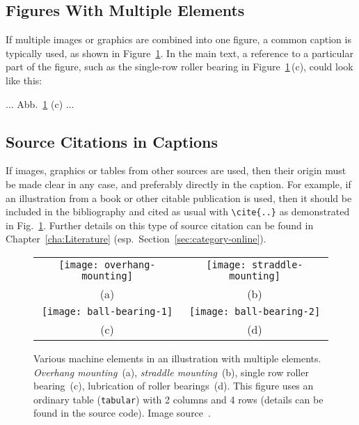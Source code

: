 \subsection{Figures With Multiple Elements}

If multiple images or graphics are combined into one figure, a common caption
is typically used, as shown in Figure~\ref{fig:Bearings}. In the main text, a
reference to a particular part of the figure, such as the single-row roller
bearing in Figure~\ref{fig:Bearings}\,(c), could look like this:
%
\begin{LaTeXCode}[numbers=none]
... Abb.~\ref{fig:Bearings} (c) ...
\end{LaTeXCode}

\subsection{Source Citations in Captions}
\label{sec:SourceCitationsInCaptions}

If images, graphics or tables from other sources are used, then their origin
must be made clear in any case, and preferably directly in the caption. For
example, if an illustration from a book or other citable publication is used,
then it should be included in the bibliography and cited as usual with
\verb!\cite{..}! as demonstrated in Fig.\ \ref{fig:Bearings}. Further details
on this type of source citation can be found in Chapter~\ref{cha:Literature}
(esp.\ Section~\ref{sec:category-online}).

\begin{figure}
    \centering\small
    \begin{tabular}{@{}c@{\hspace{12mm}}c@{}} %
        \texttt{[image: overhang-mounting]} &
        \texttt{[image: straddle-mounting]}
        \\
        (a) & (b)
        \\[4pt]    %
        \texttt{[image: ball-bearing-1]} &
        \texttt{[image: ball-bearing-2]}
        \\
        (c) & (d)
    \end{tabular}
%
\caption{Various machine elements in an illustration with multiple elements.
\emph{Overhang mounting}~(a), \emph{straddle mounting}~(b), single row roller
bearing~(c), lubrication of roller bearings~(d). This figure uses an ordinary
table (\texttt{tabular}) with 2 columns and 4 rows (details can be found in
the source code). Image source~\cite{Faires1934}.}
\label{fig:Bearings}
\end{figure}


